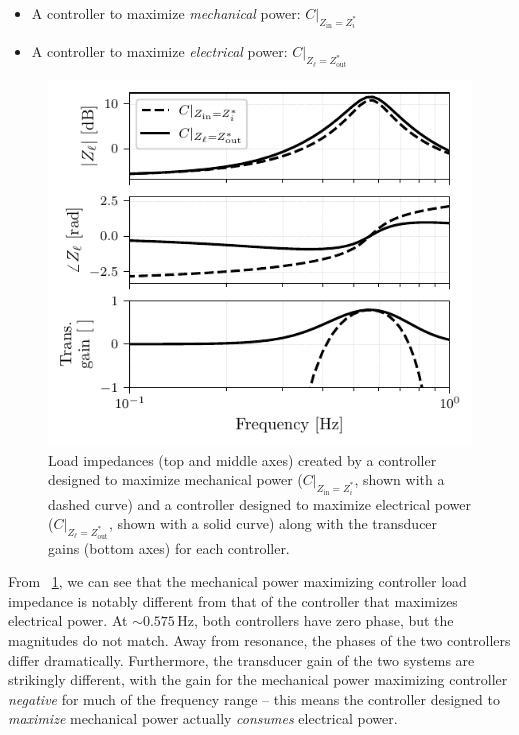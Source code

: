 \documentclass[twocolumn]{autart}
\begin{document}
\begin{itemize}
        \item A controller to maximize \emph{mechanical} power: $C \vert_{Z_{\textrm{in}} = Z_i^*}$
        \item A controller to maximize \emph{electrical} power: $C \vert_{Z_\ell = Z_{\mathrm{out}}^*}$
\end{itemize}%
%
\begin{figure}[tb]
        \centering
        \includegraphics[width=1\columnwidth]{wec_as_multiport_load_impedance_for_mech_power_Bode.pdf}
        \caption{Load impedances (top and middle axes) created by a controller designed to maximize mechanical power ($C \vert_{Z_{\textrm{in}} = Z_i^*}$, shown with a dashed curve) and a controller designed to maximize electrical power ($C \vert_{Z_\ell = Z_{\mathrm{out}}^*}$, shown with a solid curve) along with the transducer gains (bottom axes) for each controller.}
        \label{fig:wec_as_multiport_load_impedance_for_mech_power}
\end{figure}
%
From \figurename~\ref{fig:wec_as_multiport_load_impedance_for_mech_power}, we can see that the mechanical power maximizing controller load impedance is notably different from that of the controller that maximizes electrical power.
At $\sim 0.575$\,Hz, both controllers have zero phase, but the magnitudes do not match.
Away from resonance, the phases of the two controllers differ dramatically.
Furthermore, the transducer gain of the two systems are strikingly different, with the gain for the mechanical power maximizing controller \emph{negative} for much of the frequency range -- this means the controller designed to \emph{maximize} mechanical power actually \emph{consumes} electrical power.
\end{document}
